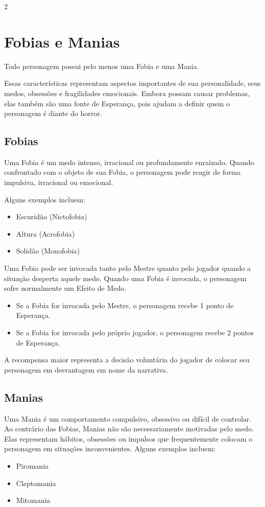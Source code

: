 \documentclass[a4paper,11pt,openany]{book}
\begin{document}
\begin{multicols}{2}
\section{Fobias e Manias}

Todo personagem possui pelo menos uma Fobia e uma Mania. 

Essas características representam aspectos importantes de sua personalidade, seus medos, obsessões e fragilidades emocionais. Embora possam causar problemas, elas também são uma fonte de Esperança, pois ajudam a definir quem o personagem é diante do horror.

\subsection{Fobias}

Uma Fobia é um medo intenso, irracional ou profundamente enraizado. Quando confrontado com o objeto de sua Fobia, o personagem pode reagir de forma impulsiva, irracional ou emocional.

Alguns exemplos incluem:
\begin{itemize}
\item Escuridão (Nictofobia)
\item Altura (Acrofobia)
\item Solidão (Monofobia)
\end{itemize}

Uma Fobia pode ser invocada tanto pelo Mestre quanto pelo jogador quando a situação desperta aquele medo. Quando uma Fobia é invocada, o personagem sofre normalmente um Efeito de Medo.

\begin{itemize}
\item Se a Fobia for invocada pelo Mestre, o personagem recebe 1 ponto de Esperança.
\item Se a Fobia for invocada pelo próprio jogador, o personagem recebe 2 pontos de Esperança.
\end{itemize}

A recompensa maior representa a decisão voluntária do jogador de colocar seu personagem em desvantagem em nome da narrativa.

\subsection{Manias}

Uma Mania é um comportamento compulsivo, obsessivo ou difícil de controlar. Ao contrário das Fobias, Manias não são necessariamente motivadas pelo medo. Elas representam hábitos, obsessões ou impulsos que frequentemente colocam o personagem em situações inconvenientes. Alguns exemplos incluem:
\begin{itemize}
\item Piromania
\item Cleptomania
\item Mitomania
\end{itemize}


\end{multicols}
\end{document}
